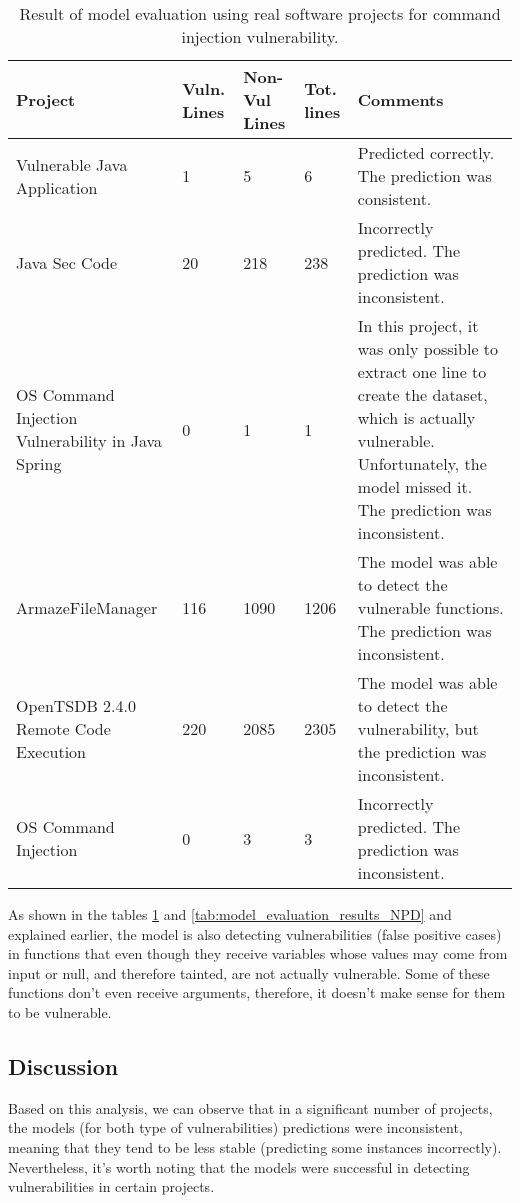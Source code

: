 \begin{table}[!ht]
    \centering
    \caption{Result of model evaluation  using real software projects for command injection vulnerability.}
    \begin{tabular}{|p{1.5in}|p{0.5in}|p{0.5in}|p{0.5in}|p{3in}|}
    \hline
        \textbf{Project} & \textbf{Vuln. Lines} & \textbf{Non-Vul Lines} & \textbf{Tot. lines } & \textbf{Comments} \\ \hline
        Vulnerable Java Application & 1 & 5 & 6 & Predicted correctly. The prediction was consistent. \\ \hline
        Java Sec Code & 20 & 218 & 238 & Incorrectly predicted. The prediction was inconsistent. \\ \hline
        OS Command Injection Vulnerability in Java Spring & 0 & 1 & 1 & In this project, it was only possible to extract one line to create the dataset, which is actually vulnerable. Unfortunately, the model missed it. The prediction was inconsistent. \\ \hline
        ArmazeFileManager & 116 & 1090 & 1206 & The model was able to detect the vulnerable functions. The prediction was inconsistent. \\ \hline
        OpenTSDB 2.4.0 Remote Code Execution & 220 & 2085 & 2305 & The model was able to detect the vulnerability, but the prediction was inconsistent. \\ \hline
        OS Command Injection & 0 & 3 & 3 & Incorrectly predicted. The prediction was inconsistent. \\ \hline
    \end{tabular}
	\label{tab:model_evaluation_results_CI}
\end{table}


As shown in the tables \ref{tab:model_evaluation_results_CI} and \ref{tab:model_evaluation_results_NPD} and explained earlier, the model is also detecting vulnerabilities (false positive cases) in functions that even though they receive variables whose values may come from input or null, and therefore tainted, are not actually vulnerable. Some of these functions don't even receive arguments, therefore, it doesn't make sense for them to be vulnerable.

\subsection{Discussion} %
\label{sec:Model_Eval_Discussion}

Based on this analysis, we can observe that in a significant number of projects, the models (for both type of vulnerabilities) predictions were inconsistent, meaning that they tend to be less stable (predicting some instances incorrectly). Nevertheless, it's worth noting that the models were successful in detecting vulnerabilities in certain projects.

